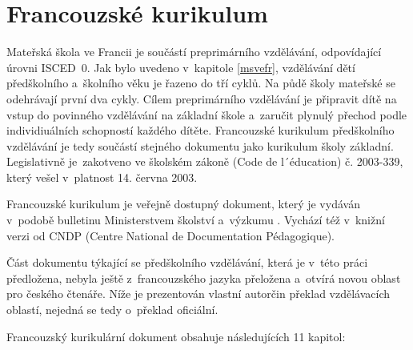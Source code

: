 	\section{Francouzské kurikulum}
	\label{frkurikulum}

		Mateřská škola ve Francii je součástí preprimárního vzdělávání, odpovídající úrovni ISCED~0. Jak bylo uvedeno v~kapitole \ref{msvefr}, vzdělávání dětí předškolního a~školního věku je řazeno do tří cyklů. Na půdě školy mateřské se odehrávají první dva cykly. Cílem preprimárního vzdělávání je připravit dítě na vstup do povinného vzdělávání na základní škole a~zaručit plynulý přechod podle individiuálních schopností každého dítěte. Francouzské kurikulum předškolního vzdělávání je tedy součástí stejného dokumentu jako kurikulum školy základní. Legislativně je zakotveno ve školském zákoně (Code de l´éducation) č. 2003-339, který vešel v platnost 14. června 2003.
	
		Francouzské kurikulum je veřejně dostupný dokument, který je vydáván v~podobě bulletinu Ministerstvem školství a~výzkumu \citep{buletin}. Vychází též v knižní verzi od CNDP (Centre National de Documentation Pédagogique)\citep{CNDP}.

		Část dokumentu týkající se předškolního vzdělávání, která je v~této práci předložena, nebyla ještě z~francouzského jazyka přeložena a~otvírá novou oblast pro českého čtenáře. Níže je prezentován vlastní autorčin překlad vzdělávacích oblastí, nejedná se tedy o~překlad oficiální. 

		Francouzský kurikulární dokument obsahuje následujících 11 kapitol: 

